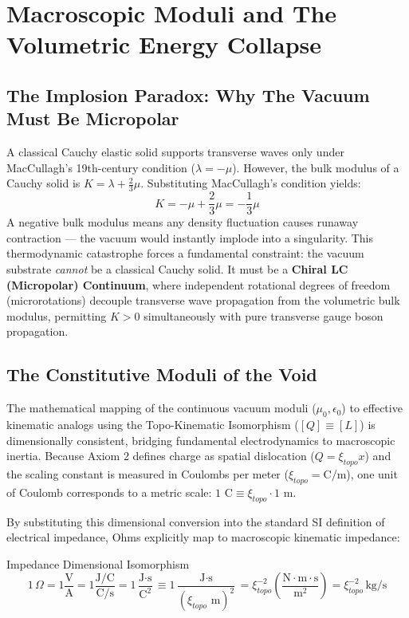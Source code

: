 \chapter{Macroscopic Moduli and The Volumetric Energy Collapse}
\label{ch:macroscopic_moduli}

\section{The Implosion Paradox: Why The Vacuum Must Be Micropolar}

A classical Cauchy elastic solid supports transverse waves only under MacCullagh's 19th-century condition ($\lambda = -\mu$). However, the bulk modulus of a Cauchy solid is $K = \lambda + \frac{2}{3}\mu$. Substituting MacCullagh's condition yields:
\begin{equation}
    K = -\mu + \frac{2}{3}\mu = -\frac{1}{3}\mu
\end{equation}
A negative bulk modulus means any density fluctuation causes runaway contraction --- the vacuum would instantly implode into a singularity. This thermodynamic catastrophe forces a fundamental constraint: the vacuum substrate \textit{cannot} be a classical Cauchy solid. It must be a \textbf{Chiral LC (Micropolar) Continuum}, where independent rotational degrees of freedom (microrotations) decouple transverse wave propagation from the volumetric bulk modulus, permitting $K > 0$ simultaneously with pure transverse gauge boson propagation.

\section{The Constitutive Moduli of the Void}

The mathematical mapping of the continuous vacuum moduli ($\mu_{0},\epsilon_{0}$) to effective kinematic analogs
using the Topo-Kinematic Isomorphism ($[Q]\equiv[L]$) is dimensionally consistent, bridging fundamental electrodynamics to macroscopic inertia. Because Axiom 2 defines charge
as spatial dislocation ($Q=\xi_{topo}x$) and the scaling constant is measured in Coulombs
per meter ($\xi_{topo}=\text{C/m}$), one unit of Coulomb corresponds to a metric
scale: $1 \text{ C} \equiv \xi_{topo} \cdot 1 \text{ m}$.

By substituting this dimensional conversion into the standard SI
definition of electrical impedance, Ohms explicitly map to macroscopic kinematic impedance:

\begin{resultbox}{Impedance Dimensional Isomorphism}
\begin{equation}
1\,\Omega = 1\frac{\text{V}}{\text{A}} = 1\frac{\text{J/C}}{\text{C/s}} = 1\frac{\text{J}\cdot\text{s}}{\text{C}^2} \equiv 1\frac{\text{J}\cdot\text{s}}{(\xi_{topo}\text{ m})^2} = \xi_{topo}^{-2}\left(\frac{\text{N}\cdot\text{m}\cdot\text{s}}{\text{m}^2}\right) = \xi_{topo}^{-2}\,\text{kg/s}
\end{equation}
\end{resultbox}

